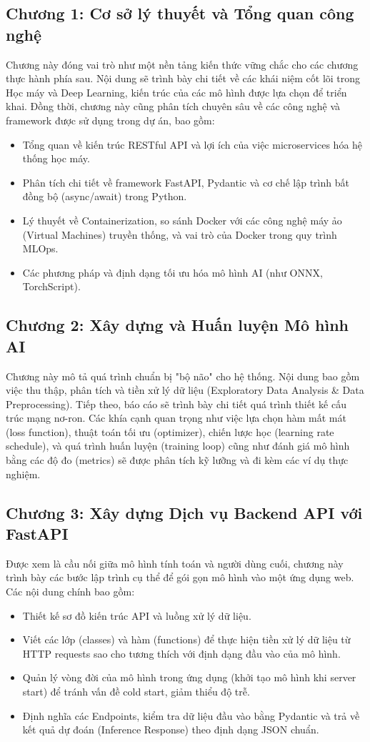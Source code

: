 \documentclass[12pt,a4paper]{article}
\begin{document}
\subsection*{Chương 1: Cơ sở lý thuyết và Tổng quan công nghệ}
Chương này đóng vai trò như một nền tảng kiến thức vững chắc cho các chương thực hành phía sau. Nội dung sẽ trình bày chi tiết về các khái niệm cốt lõi trong Học máy và Deep Learning, kiến trúc của các mô hình được lựa chọn để triển khai. Đồng thời, chương này cũng phân tích chuyên sâu về các công nghệ và framework được sử dụng trong dự án, bao gồm:
\begin{itemize}
    \item Tổng quan về kiến trúc RESTful API và lợi ích của việc microservices hóa hệ thống học máy.
    \item Phân tích chi tiết về framework FastAPI, Pydantic và cơ chế lập trình bất đồng bộ (async/await) trong Python.
    \item Lý thuyết về Containerization, so sánh Docker với các công nghệ máy ảo (Virtual Machines) truyền thống, và vai trò của Docker trong quy trình MLOps.
    \item Các phương pháp và định dạng tối ưu hóa mô hình AI (như ONNX, TorchScript).
\end{itemize}

\subsection*{Chương 2: Xây dựng và Huấn luyện Mô hình AI}
Chương này mô tả quá trình chuẩn bị "bộ não" cho hệ thống. Nội dung bao gồm việc thu thập, phân tích và tiền xử lý dữ liệu (Exploratory Data Analysis \& Data Preprocessing). Tiếp theo, báo cáo sẽ trình bày chi tiết quá trình thiết kế cấu trúc mạng nơ-ron. Các khía cạnh quan trọng như việc lựa chọn hàm mất mát (loss function), thuật toán tối ưu (optimizer), chiến lược học (learning rate schedule), và quá trình huấn luyện (training loop) cũng như đánh giá mô hình bằng các độ đo (metrics) sẽ được phân tích kỹ lưỡng và đi kèm các ví dụ thực nghiệm.

\subsection*{Chương 3: Xây dựng Dịch vụ Backend API với FastAPI}
Được xem là cầu nối giữa mô hình tính toán và người dùng cuối, chương này trình bày các bước lập trình cụ thể để gói gọn mô hình vào một ứng dụng web. Các nội dung chính bao gồm:
\begin{itemize}
    \item Thiết kế sơ đồ kiến trúc API và luồng xử lý dữ liệu.
    \item Viết các lớp (classes) và hàm (functions) để thực hiện tiền xử lý dữ liệu từ HTTP requests sao cho tương thích với định dạng đầu vào của mô hình.
    \item Quản lý vòng đời của mô hình trong ứng dụng (khởi tạo mô hình khi server start) để tránh vấn đề cold start, giảm thiểu độ trễ.
    \item Định nghĩa các Endpoints, kiểm tra dữ liệu đầu vào bằng Pydantic và trả về kết quả dự đoán (Inference Response) theo định dạng JSON chuẩn.
\end{itemize}
\end{document}
